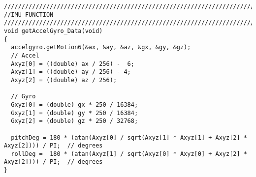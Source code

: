 \begin{lstlisting}
//////////////////////////////////////////////////////////////////////////////
//IMU FUNCTION
//////////////////////////////////////////////////////////////////////////////
void getAccelGyro_Data(void)
{
  accelgyro.getMotion6(&ax, &ay, &az, &gx, &gy, &gz);
  // Accel
  Axyz[0] = ((double) ax / 256) -  6;
  Axyz[1] = ((double) ay / 256) - 4;
  Axyz[2] = ((double) az / 256);
 
  // Gyro
  Gxyz[0] = (double) gx * 250 / 16384;
  Gxyz[1] = (double) gy * 250 / 16384;
  Gxyz[2] = (double) gz * 250 / 32768;
 
  pitchDeg = 180 * (atan(Axyz[0] / sqrt(Axyz[1] * Axyz[1] + Axyz[2] * Axyz[2]))) / PI;  // degrees
  rollDeg =  180 * (atan(Axyz[1] / sqrt(Axyz[0] * Axyz[0] + Axyz[2] * Axyz[2]))) / PI;  // degrees
}
\end{lstlisting}